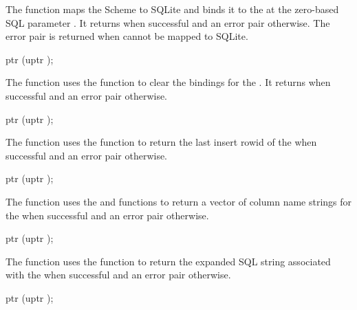 The  function maps the Scheme 
to SQLite and binds it to the  at the zero-based SQL
parameter .  It returns  when successful and an
error pair otherwise. The error pair  is returned when  cannot be
mapped to SQLite.

\begin{function}
  ptr (uptr );
\end{function}

The  function uses the
 function to clear the bindings for the
. It returns  when successful and an error
pair otherwise.

\begin{function}
  ptr (uptr );
\end{function}

The  function uses the
 function to return the last insert
rowid of the  when successful and an error pair
otherwise.

\begin{function}
  ptr (uptr );
\end{function}

The  function uses the
 and 
functions to return a vector of column name strings for the
 when successful and an error pair otherwise.

\begin{function}
  ptr (uptr );
\end{function}

The  function uses the
 function to return the expanded SQL
string associated with the  when successful and an
error pair otherwise.

\begin{function}
  ptr (uptr );
\end{function}

